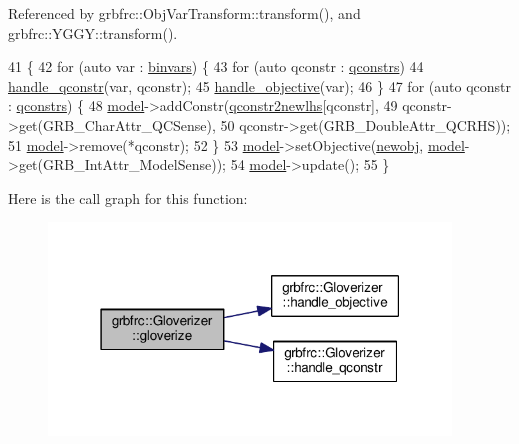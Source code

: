 Referenced by grbfrc\+::\+Obj\+Var\+Transform\+::transform(), and grbfrc\+::\+Y\+G\+G\+Y\+::transform().


\begin{DoxyCode}
41                            \{
42     \textcolor{keywordflow}{for} (\textcolor{keyword}{auto} var : \hyperlink{classgrbfrc_1_1Gloverizer_a4a6d4fcf4c8a82c009b0fe585555b442}{binvars}) \{
43         \textcolor{keywordflow}{for} (\textcolor{keyword}{auto} qconstr : \hyperlink{classgrbfrc_1_1Gloverizer_a813600069f781a32bd9b859da8a745e3}{qconstrs})
44             \hyperlink{classgrbfrc_1_1Gloverizer_a94a1a62395d6ec2d8ba418a812cfbed7}{handle\_qconstr}(var, qconstr);
45         \hyperlink{classgrbfrc_1_1Gloverizer_ac5074a3f184676514d56f1fc2b7a69f4}{handle\_objective}(var);
46     \}
47     \textcolor{keywordflow}{for} (\textcolor{keyword}{auto} qconstr : \hyperlink{classgrbfrc_1_1Gloverizer_a813600069f781a32bd9b859da8a745e3}{qconstrs}) \{
48         \hyperlink{classgrbfrc_1_1Gloverizer_a80edd56f6e5b43696506593a766ef989}{model}->addConstr(\hyperlink{classgrbfrc_1_1Gloverizer_a2cc2507852bba8494b917aaed8a38d6a}{qconstr2newlhs}[qconstr],
49                          qconstr->get(GRB\_CharAttr\_QCSense),
50                          qconstr->get(GRB\_DoubleAttr\_QCRHS));
51         \hyperlink{classgrbfrc_1_1Gloverizer_a80edd56f6e5b43696506593a766ef989}{model}->remove(*qconstr);
52     \}
53     \hyperlink{classgrbfrc_1_1Gloverizer_a80edd56f6e5b43696506593a766ef989}{model}->setObjective(\hyperlink{classgrbfrc_1_1Gloverizer_a38a674b64d09932859b9a0efd3acf723}{newobj}, \hyperlink{classgrbfrc_1_1Gloverizer_a80edd56f6e5b43696506593a766ef989}{model}->get(GRB\_IntAttr\_ModelSense));
54     \hyperlink{classgrbfrc_1_1Gloverizer_a80edd56f6e5b43696506593a766ef989}{model}->update();
55 \}
\end{DoxyCode}


Here is the call graph for this function\+:
\nopagebreak
\begin{figure}[H]
\begin{center}
\leavevmode
\includegraphics[width=303pt]{classgrbfrc_1_1Gloverizer_aa9c5f76ffc566944c56d6a45beee16e7_cgraph}
\end{center}
\end{figure}




